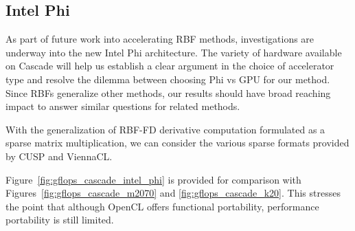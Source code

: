 \documentclass{report}
\begin{document}
\subsection{Intel Phi} 

As part of future work into accelerating RBF methods, investigations are underway into the new Intel Phi architecture. The variety of hardware available on Cascade will help us establish a clear argument in the choice of accelerator type and resolve the dilemma between choosing Phi vs GPU for our method. Since RBFs generalize other methods, our results should have broad reaching impact to answer similar questions for related methods.


With the generalization of RBF-FD derivative computation formulated as a sparse matrix multiplication, we can 
consider the various sparse formats provided by CUSP and ViennaCL. 



Figure~\ref{fig:gflops_cascade_intel_phi} is provided for comparison with Figures~\ref{fig:gflops_cascade_m2070} and \ref{fig:gflops_cascade_k20}. This stresses the point that although OpenCL offers functional portability, performance portability is still limited. 
\end{document}
